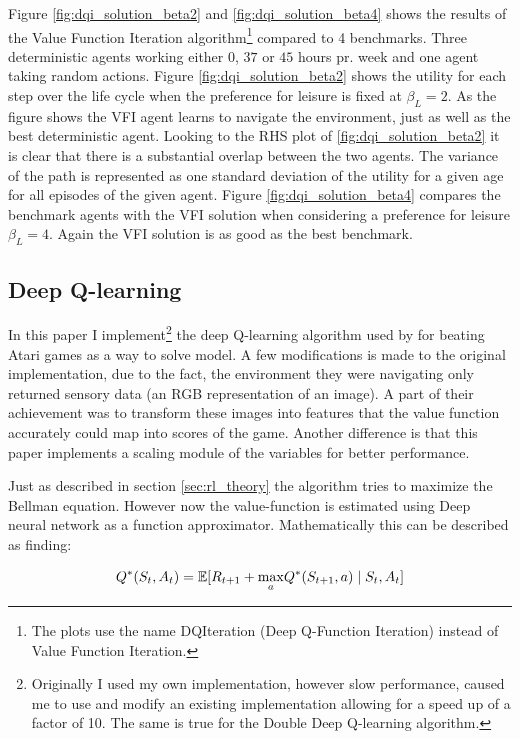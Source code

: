 Figure \ref{fig:dqi_solution_beta2} and \ref{fig:dqi_solution_beta4} shows the results of the Value Function Iteration algorithm\footnote{The plots use the name DQIteration (Deep Q-Function Iteration) instead of Value Function Iteration.} compared to 4 benchmarks. Three deterministic agents working either $0$, $37$ or $45$ hours pr. week and one agent taking random actions. Figure \ref{fig:dqi_solution_beta2} shows the utility for each step over the life cycle when the preference for leisure is fixed at $\beta_L = 2$. As the figure shows the VFI agent learns to navigate the environment, just as well as the best deterministic agent. Looking to the RHS plot of \ref{fig:dqi_solution_beta2} it is clear that there is a substantial overlap between the two agents. The variance of the path is represented as one standard deviation of the utility for a given age for all episodes of the given agent. Figure \ref{fig:dqi_solution_beta4} compares the benchmark agents with the VFI solution when considering a preference for leisure $\beta_L = 4$. Again the VFI solution is as good as the best benchmark.

\subsection{Deep Q-learning}

In this paper I implement\footnote{Originally I used my own implementation, however slow performance, caused me to use and modify an existing implementation allowing for a speed up of a factor of 10. The same is true for the Double Deep Q-learning algorithm.} the deep Q-learning algorithm used by \textcite{mnih_playing_2013} for beating Atari games as a way to solve model. A few modifications is made to the original implementation, due to the fact, the environment they were navigating only returned sensory data (an RGB representation of an image).  A part of their achievement was to transform these images into features that the value function accurately could map into scores of the game. Another difference is that this paper implements a scaling module of the variables for better performance.

Just as described in section \ref{sec:rl_theory} the algorithm tries to maximize the Bellman equation. However now the value-function is estimated using Deep neural network as a function approximator. Mathematically this can be described as finding:

\begin{equation}
    Q^*(S_t,A_t) = \mathbb{E} [R_{t+1} + \underset{a}{\max}  Q^*(S_{t+1}, a) \mid S_t, A_t]
\end{equation}

